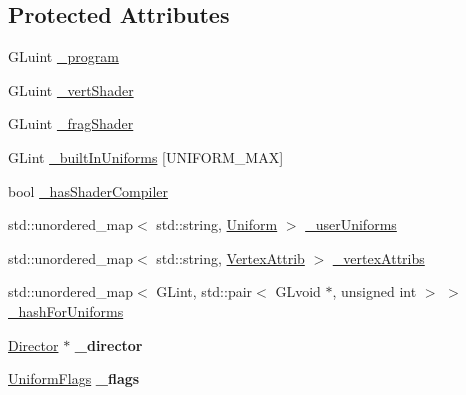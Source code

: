\subsection*{Protected Attributes}
\begin{DoxyCompactItemize}
\item 
G\+Luint \hyperlink{classGLProgram_a18567c308d8f76f662c744d63e8d7287}{\+\_\+program}
\item 
G\+Luint \hyperlink{classGLProgram_ab46b7765e4da8575d16c197612a43328}{\+\_\+vert\+Shader}
\item 
G\+Luint \hyperlink{classGLProgram_ab72b0bfa1b921f4866dbcd380092f829}{\+\_\+frag\+Shader}
\item 
G\+Lint \hyperlink{classGLProgram_a8fe97273926c87df2cd0a5ae28d4dc14}{\+\_\+built\+In\+Uniforms} \mbox{[}U\+N\+I\+F\+O\+R\+M\+\_\+\+M\+AX\mbox{]}
\item 
bool \hyperlink{classGLProgram_a87326e8b019abe05ba11580c37dabeed}{\+\_\+has\+Shader\+Compiler}
\item 
std\+::unordered\+\_\+map$<$ std\+::string, \hyperlink{structUniform}{Uniform} $>$ \hyperlink{classGLProgram_a7e5235e36706174498223004ddd3a834}{\+\_\+user\+Uniforms}
\item 
std\+::unordered\+\_\+map$<$ std\+::string, \hyperlink{structVertexAttrib}{Vertex\+Attrib} $>$ \hyperlink{classGLProgram_a83faadac509e82dcec31bda7fc8f1a1c}{\+\_\+vertex\+Attribs}
\item 
std\+::unordered\+\_\+map$<$ G\+Lint, std\+::pair$<$ G\+Lvoid $\ast$, unsigned int $>$ $>$ \hyperlink{classGLProgram_a9e2ad08f6864b82dd6eb199960b33529}{\+\_\+hash\+For\+Uniforms}
\item 
\mbox{\label{classGLProgram_a08ca6c6d8343e5791303173115104516}} 
\hyperlink{classDirector}{Director} $\ast$ {\bfseries \+\_\+director}
\item 
\mbox{\label{classGLProgram_a84f26d22961dd179cf054f5256474603}} 
\hyperlink{structGLProgram_1_1UniformFlags}{Uniform\+Flags} {\bfseries \+\_\+flags}
\end{DoxyCompactItemize}
